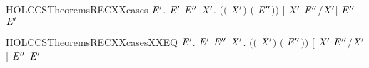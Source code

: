\begin{SaveVerbatim}{HOLCCSTheoremsRECXXcases}
\HOLTokenTurnstile{} \HOLSymConst{\HOLTokenForall{}}   \ensuremath{\HOLBoundVar{E}\sp{\prime}}.
          \HOLTokenTransBegin{}\HOLTokenTransEnd \ensuremath{\HOLBoundVar{E}\sp{\prime}} \HOLSymConst{\HOLTokenImp{}}
       \HOLSymConst{\HOLTokenExists{}}\ensuremath{\HOLBoundVar{E}\sp{\prime\prime}} \ensuremath{\HOLBoundVar{X}\sp{\prime}}.
           \ensuremath{(}\ensuremath{(} \HOLSymConst{\ensuremath{=}} \ensuremath{\HOLBoundVar{X}\sp{\prime}}\ensuremath{)} \HOLSymConst{\HOLTokenConj{}} \ensuremath{(} \HOLSymConst{\ensuremath{=}} \ensuremath{\HOLBoundVar{E}\sp{\prime\prime}}\ensuremath{)}\ensuremath{)} \HOLSymConst{\HOLTokenConj{}} \ensuremath{[} \ensuremath{\HOLBoundVar{X}\sp{\prime}} \ensuremath{\HOLBoundVar{E}\sp{\prime\prime}}\ensuremath{/}\ensuremath{\HOLBoundVar{X}\sp{\prime}}\ensuremath{]} \ensuremath{\HOLBoundVar{E}\sp{\prime\prime}} \HOLTokenTransBegin{}\HOLTokenTransEnd \ensuremath{\HOLBoundVar{E}\sp{\prime}}
\end{SaveVerbatim}
\newcommand{\HOLCCSTheoremsRECXXcases}{\UseVerbatim{HOLCCSTheoremsRECXXcases}}
\begin{SaveVerbatim}{HOLCCSTheoremsRECXXcasesXXEQ}
\HOLTokenTurnstile{} \HOLSymConst{\HOLTokenForall{}}   \ensuremath{\HOLBoundVar{E}\sp{\prime}}.
          \HOLTokenTransBegin{}\HOLTokenTransEnd \ensuremath{\HOLBoundVar{E}\sp{\prime}} \HOLSymConst{\HOLTokenEquiv{}}
       \HOLSymConst{\HOLTokenExists{}}\ensuremath{\HOLBoundVar{E}\sp{\prime\prime}} \ensuremath{\HOLBoundVar{X}\sp{\prime}}.
           \ensuremath{(}\ensuremath{(} \HOLSymConst{\ensuremath{=}} \ensuremath{\HOLBoundVar{X}\sp{\prime}}\ensuremath{)} \HOLSymConst{\HOLTokenConj{}} \ensuremath{(} \HOLSymConst{\ensuremath{=}} \ensuremath{\HOLBoundVar{E}\sp{\prime\prime}}\ensuremath{)}\ensuremath{)} \HOLSymConst{\HOLTokenConj{}} \ensuremath{[} \ensuremath{\HOLBoundVar{X}\sp{\prime}} \ensuremath{\HOLBoundVar{E}\sp{\prime\prime}}\ensuremath{/}\ensuremath{\HOLBoundVar{X}\sp{\prime}}\ensuremath{]} \ensuremath{\HOLBoundVar{E}\sp{\prime\prime}} \HOLTokenTransBegin{}\HOLTokenTransEnd \ensuremath{\HOLBoundVar{E}\sp{\prime}}
\end{SaveVerbatim}
\newcommand{\HOLCCSTheoremsRECXXcasesXXEQ}{\UseVerbatim{HOLCCSTheoremsRECXXcasesXXEQ}}
